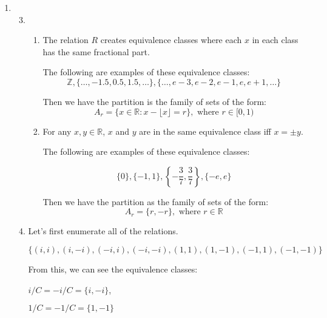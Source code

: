 \documentclass[12pt,letterpaper]{article}
\begin{document}
\begin{enumerate}
\begin{enumerate}
\begin{proof}
            So $S$ is not transitive.

            Thus, $S$ is not an equivalence relation.
          \end{proof}
      \end{enumerate}
    \item
      \begin{enumerate}
        \setcounter{enumii}{2}
        \item
          \begin{enumerate}
            \item
              The relation $R$ creates equivalence classes where each $x$ in each class has the same fractional part.

              The following are examples of these equivalence classes:
              \[
                \mathbb{Z}, \{\dots, -1.5, 0.5, 1.5, \dots\}, \{\dots, e - 3, e - 2, e - 1, e, e + 1, \dots\}
              \]

              Then we have the partition is the family of sets of the form:
              \[
                A_r = \{x \in \mathbb{R} : x - \lfloor x \rfloor = r\}, \text{ where } r \in [0, 1)
              \]
            \setcounter{enumiii}{3}
            \item
              For any $x, y \in \mathbb{R}$, $x$ and $y$ are in the same equivalence class iff $x = \pm y$.

              The following are examples of these equivalence classes:

              \[
                \{0\}, \{-1, 1\}, \left\{-\frac{3}{7}, \frac{3}{7}\right\}, \{-e, e\}
              \]

              Then we have the partition as the family of sets of the form:
              \[
                A_r = \{r, -r\}, \text{ where } r \in \mathbb{R}
              \]
          \end{enumerate}
        \item
          Let's first enumerate all of the relations.

          \[
            \{(i, i), (i, -i), (-i, i), (-i, -i), (1, 1), (1, -1), (-1, 1), (-1, -1)\}
          \]

          From this, we can see the equivalence classes:

          $i / C = -i / C = \{i, -i\}$,

          $1 / C = -1 / C = \{1, -1\}$


\end{enumerate}
\end{enumerate}
\end{document}
